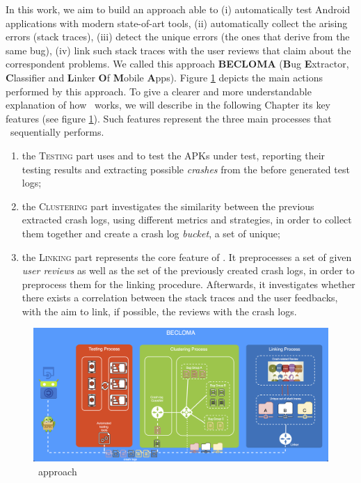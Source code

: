 \label{chapter:approach}
In this work, we aim to build an approach able to (i) automatically test Android applications with modern state-of-art tools, (ii) automatically collect the arising errors (\ie stack traces), (iii) detect the unique errors (\ie the ones that derive from the same bug), (iv) link such stack traces with the user reviews that claim about the correspondent problems.           
We called this approach \textbf{BECLOMA} (\textbf{B}ug \textbf{E}xtractor, \textbf{C}lassifier and \textbf{L}inker \textbf{O}f \textbf{M}obile \textbf{A}pps).
Figure \ref{fig: becloma} depicts the main actions performed by this approach.
To give a clearer and more understandable explanation of how \toolname\ works, we will describe in the following Chapter its key features (see figure \ref{fig: becloma}). Such features represent the three main processes that \toolname\ sequentially performs.
\begin{enumerate}
\item the \textsc{Testing} part uses \monkey and \sapienz to test the APKs under test, reporting their testing results and extracting possible \textit{crashes} from the before generated test logs; 

\item the \textsc{Clustering} part investigates the similarity between the previous extracted crash logs, using different metrics and strategies, in order to collect them together and create a crash log \textit{bucket}, \ie a set of unique; 

\item the \textsc{Linking} part represents the core feature of \toolname. It preprocesses a set of given \textit{user reviews} as well as the set of the previously created crash logs, in order to preprocess them for the linking procedure. Afterwards, it investigates whether there exists a correlation between the stack traces and the user feedbacks, with the aim to link, if possible, the reviews with the crash logs. 
\end{enumerate}
\begin{figure}[tb]
\centering 
\includegraphics[width=\columnwidth]{diagrams/becloma_approach_img} 
\caption{\toolname\ approach}
\label{fig: becloma}
\end{figure}


